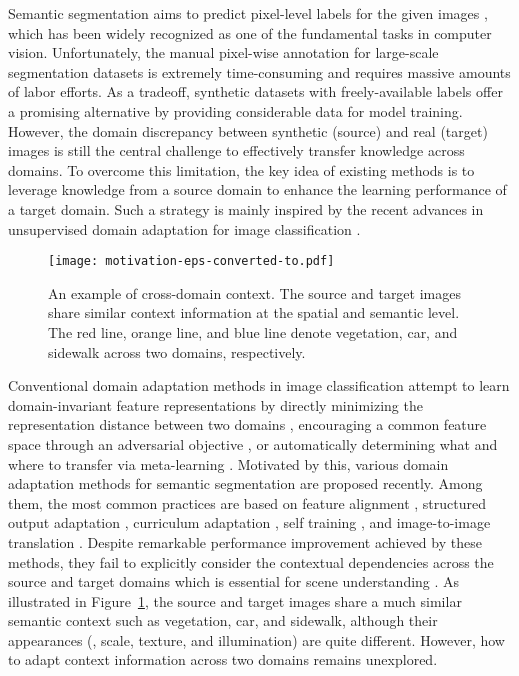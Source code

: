 \documentclass[10pt,twocolumn,letterpaper]{article}
\begin{document}
	Semantic segmentation aims to predict pixel-level labels for the given images \cite{long2015fully, chen2018deeplab}, which has been widely recognized as one of the fundamental tasks in computer vision. Unfortunately, the manual pixel-wise annotation for large-scale segmentation datasets is extremely time-consuming and requires massive amounts of labor efforts. As a tradeoff, synthetic datasets \cite{richter2016playing, ros2016synthia} with freely-available labels offer a promising alternative by providing considerable data for model training. However, the domain discrepancy between synthetic (source) and real (target) images is still the central challenge to effectively transfer knowledge across domains. To overcome this limitation, the key idea of existing methods is to leverage knowledge from a source domain to enhance the learning performance of a target domain. Such a strategy is mainly inspired by the recent advances in unsupervised domain adaptation for image classification \cite{pan2009survey}.



	\begin{figure}[t]
		\begin{center}
			\texttt{[image: motivation-eps-converted-to.pdf]}
		\end{center}
		\caption{An example of cross-domain context. The source and target images share similar context information at the spatial and semantic level. The red line, orange line, and blue line denote vegetation, car, and sidewalk across two domains, respectively.}
		\label{fig:motivation}
		\vspace{-0.2in}
	\end{figure}

	Conventional domain adaptation methods in image classification attempt to learn domain-invariant feature representations by directly minimizing the representation distance between two domains \cite{tzeng2014deep, long2015learning, long2017deep}, encouraging a common feature space through an adversarial objective \cite{ganin2014unsupervised, tzeng2017adversarial}, or automatically determining what and where to transfer via meta-learning \cite{ying2018transfer, jang2019learning}. Motivated by this, various domain adaptation methods for semantic segmentation are proposed recently. Among them, the most common practices are based on feature alignment \cite{hoffman2016fcns}, structured output adaptation \cite{tsai2018learning}, curriculum adaptation \cite{zhang2017curriculum, lian2019constructing}, self training \cite{zou2018unsupervised, li2019bidirectional}, and image-to-image translation \cite{hoffman2017cycada, li2019bidirectional, chen2019crdoco, chen2019learning}. Despite remarkable performance improvement achieved by these methods, they fail to explicitly consider the contextual dependencies across the source and target domains which is essential for scene understanding \cite{zhang2018context, zhao2018psanet}. As illustrated in Figure~\ref{fig:motivation}, the source and target images share a much similar semantic context such as vegetation, car, and sidewalk, although their appearances (\eg, scale, texture, and illumination) are quite different. However, how to adapt context information across two domains remains unexplored.
\end{document}
